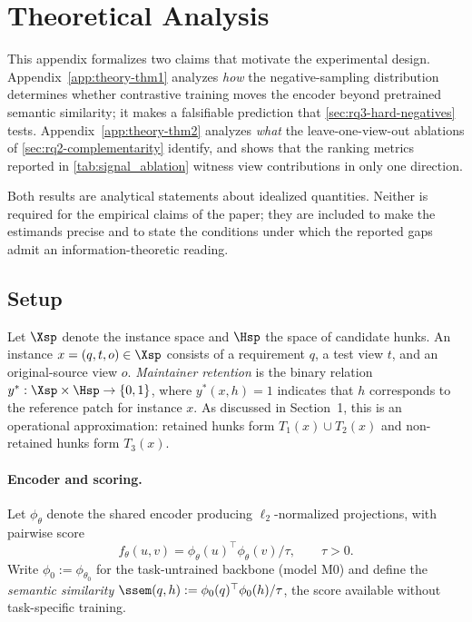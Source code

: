 \section{Theoretical Analysis}
\label{app:theory}

This appendix formalizes two claims that motivate the experimental design. Appendix~\ref{app:theory-thm1} analyzes \emph{how} the negative-sampling distribution determines whether contrastive training moves the encoder beyond pretrained semantic similarity; it makes a falsifiable prediction that \cref{sec:rq3-hard-negatives} tests. Appendix~\ref{app:theory-thm2} analyzes \emph{what} the leave-one-view-out ablations of \cref{sec:rq2-complementarity} identify, and shows that the ranking metrics reported in \cref{tab:signal_ablation} witness view contributions in only one direction.

Both results are analytical statements about idealized quantities. Neither is required for the empirical claims of the paper; they are included to make the estimands precise and to state the conditions under which the reported gaps admit an information-theoretic reading.

\subsection{Setup}
\label{app:theory-setup}

Let $\Xsp$ denote the instance space and $\Hsp$ the space of candidate hunks. An instance $x = (q, t, o) \in \Xsp$ consists of a requirement $q$, a test view $t$, and an original-source view $o$. \emph{Maintainer retention} is the binary relation $y^\ast : \Xsp \times \Hsp \to \{0,1\}$, where $y^\ast(x,h) = 1$ indicates that $h$ corresponds to the reference patch for instance $x$. As discussed in Section~1, this is an operational approximation: retained hunks form $T_1(x) \cup T_2(x)$ and non-retained hunks form $T_3(x)$.

\paragraph{Encoder and scoring.}
Let $\phi_\theta$ denote the shared encoder producing $\ell_2$-normalized projections, with pairwise score
\begin{equation}
  f_\theta(u, v) = \phi_\theta(u)^\top \phi_\theta(v) / \tau,
  \qquad \tau > 0 .
\end{equation}
Write $\phi_0 := \phi_{\theta_0}$ for the task-untrained backbone (model M0) and define the \emph{semantic similarity} $\ssem(q, h) := \phi_0(q)^\top \phi_0(h)/\tau$, the score available without task-specific training.

